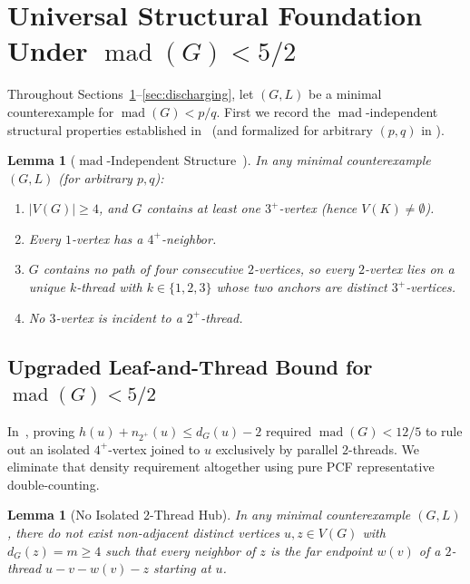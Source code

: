 \documentclass[11pt,a4paper]{article}
\newtheorem{lemma}[theorem]{Lemma}
\theoremstyle{definition}
\newcommand{\mad}{\operatorname{mad}}
\newcommand{\code}[1]{\texttt{\detokenize{#1}}}
\begin{document}
\section{Universal Structural Foundation Under \texorpdfstring{$\mad(G) < 5/2$}{mad(G) < 5/2}}\label{sec:universal}

Throughout Sections~\ref{sec:universal}--\ref{sec:discharging}, let $(G, L)$ be a minimal counterexample for $\mad(G) < p/q$. First we record the $\mad$-independent structural properties established in~\cite{LuYingSong2026} (and formalized for arbitrary $(p,q)$ in \code{CoreStructure.lean}).

\begin{lemma}[$\mad$-Independent Structure~\cite{LuYingSong2026}]\label{lem:core-struct}
In any minimal counterexample $(G, L)$ (for arbitrary $p, q$):
\begin{enumerate}[label=(\roman*),leftmargin=*,itemsep=1pt]
  \item $|V(G)| \ge 4$, and $G$ contains at least one $3^+$-vertex (hence $V(K) \neq \emptyset$).
  \item Every $1$-vertex has a $4^+$-neighbor.
  \item $G$ contains no path of four consecutive $2$-vertices, so every $2$-vertex lies on a unique $k$-thread with $k \in \{1, 2, 3\}$ whose two anchors are distinct $3^+$-vertices.
  \item No $3$-vertex is incident to a $2^+$-thread.
\end{enumerate}
\end{lemma}

\subsection{Upgraded Leaf-and-Thread Bound for \texorpdfstring{$\mad(G) < 5/2$}{mad(G) < 5/2}}

In~\cite{LuYingSong2026}, proving $h(u) + n_{2^+}(u) \le d_G(u) - 2$ required $\mad(G) < 12/5$ to rule out an isolated $4^+$-vertex joined to $u$ exclusively by parallel $2$-threads. We eliminate that density requirement altogether using pure PCF representative double-counting.

\begin{lemma}[No Isolated $2$-Thread Hub]\label{lem:no-iso-hub}
In any minimal counterexample $(G, L)$, there do not exist non-adjacent distinct vertices $u, z \in V(G)$ with $d_G(z) = m \ge 4$ such that every neighbor of $z$ is the far endpoint $w(v)$ of a $2$-thread $u - v - w(v) - z$ starting at $u$.
\end{lemma}
\end{document}
